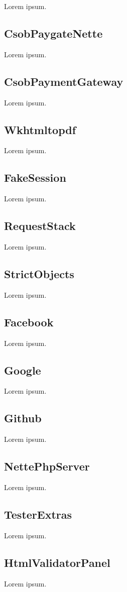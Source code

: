 Lorem ipsum.

\subsection{CsobPaygateNette}

Lorem ipsum.

\subsection{CsobPaymentGateway}

Lorem ipsum.

\subsection{Wkhtmltopdf}

Lorem ipsum.

\subsection{FakeSession}

Lorem ipsum.

\subsection{RequestStack}

Lorem ipsum.

\subsection{StrictObjects}

Lorem ipsum.

\subsection{Facebook}

Lorem ipsum.

\subsection{Google}

Lorem ipsum.

\subsection{Github}

Lorem ipsum.

\subsection{NettePhpServer}

Lorem ipsum.

\subsection{TesterExtras}

Lorem ipsum.

\subsection{HtmlValidatorPanel}

Lorem ipsum.
